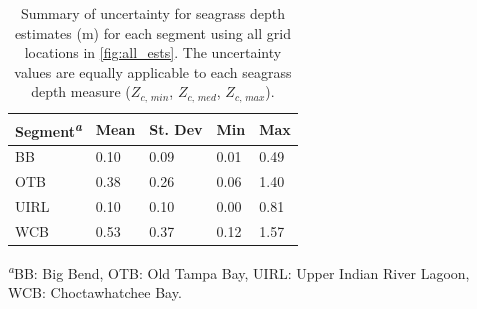 \documentclass[letterpaper,12pt,oneside]{article}\usepackage[]{graphicx}\usepackage[]{color}
\begin{document}
\begin{table}[!tbp]
\caption{Summary of uncertainty for seagrass depth estimates (m) for each segment using all grid locations in \cref{fig:all_ests}.  The uncertainty values are equally applicable to each seagrass depth measure ($Z_{c,\,min}$, $Z_{c,\,med}$, $Z_{c,\,max}$).\label{tab:sens_summ}} 
\begin{center}
\begin{tabular}{lllll}
\hline\hline
\multicolumn{1}{l}{Segment\textsuperscript{\textit{a}}}&\multicolumn{1}{c}{Mean}&\multicolumn{1}{c}{St. Dev}&\multicolumn{1}{c}{Min}&\multicolumn{1}{c}{Max}\tabularnewline
\hline
BB&0.10&0.09&0.01&0.49\tabularnewline
OTB&0.38&0.26&0.06&1.40\tabularnewline
UIRL&0.10&0.10&0.00&0.81\tabularnewline
WCB&0.53&0.37&0.12&1.57\tabularnewline
\hline
\end{tabular}\end{center}

\textsuperscript{\textit{a}}\footnotesize BB: Big Bend, OTB: Old Tampa Bay, UIRL: Upper Indian River Lagoon, WCB: Choctawhatchee Bay.\end{table}
\end{document}
